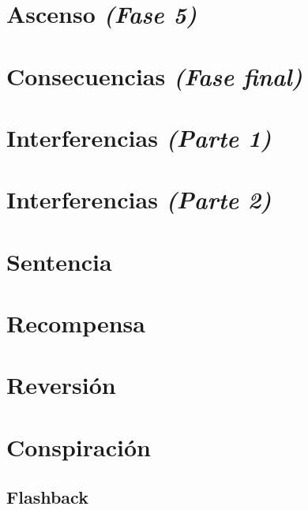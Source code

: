 \documentclass[11pt]{book}
\begin{document}
\chapter{Ascenso \emph{\mdseries(Fase 5)}}


\chapter{Consecuencias \emph{\mdseries(Fase final)}}


\chapter{Interferencias \emph{\mdseries(Parte 1)}}


\chapter{Interferencias \emph{\mdseries(Parte 2)}}


\chapter{Sentencia}


\chapter{Recompensa}


\chapter{Reversión}


\chapter{Conspiración}


\begin{appendices}
\renewcommand{\thechapter}{\arabic{chapter}}
\chapter{Flashback}

\end{appendices}
\end{document}
